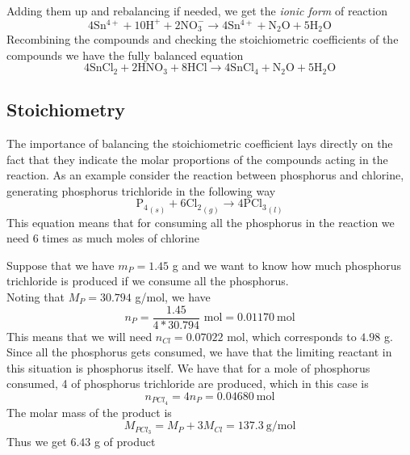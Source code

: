\documentclass[../qm.tex]{subfiles}
\begin{document}
\begin{mtd}
\begin{equation*}
\begin{aligned}
		\end{aligned}
	\end{equation*}
	Adding them up and rebalancing if needed, we get the \textit{ionic form} of reaction \label{eq:semiexp.chem}
	\begin{equation*}
		4\mathrm{Sn^{4+}}+10\mathrm{H^{+}}+2\mathrm{NO_3^-}\to4\mathrm{Sn^{4+}}+\mathrm{N_2O}+5\mathrm{H_2O}
	\end{equation*}
	Recombining the compounds and checking the stoichiometric coefficients of the compounds we have the fully balanced equation
	\begin{equation}
		4\mathrm{SnCl_2}+2\mathrm{HNO_3}+8\mathrm{HCl}\to4\mathrm{SnCl_4}+\mathrm{N_2O}+5\mathrm{H_2O}
	\end{equation}
\end{mtd}
\subsection{Stoichiometry}
The importance of balancing the stoichiometric coefficient lays directly on the fact that they indicate the molar proportions of the compounds acting in the reaction. As an example consider the reaction between phosphorus and chlorine, generating phosphorus trichloride in the following way
\begin{equation}
	\mathrm{P_4}_{(s)}+6\mathrm{Cl_2}_{(g)}\to4\mathrm{PCl_3}_{(l)}
	\label{eq:pcl3.chem}
\end{equation}
This equation means that for consuming all the phosphorus in the reaction we need 6 times as much moles of chlorine
\begin{eg}
	Suppose that we have $m_P=1.45$ g and we want to know how much phosphorus trichloride is produced if we consume all the phosphorus.\\
	Noting that $M_P=30.794$ g/mol, we have
	\begin{equation*}
		n_P=\frac{1.45}{4*30.794}\text{ mol}=0.01170\ \mathrm{mol}
	\end{equation*}
	This means that we will need $n_{Cl}=0.07022$ mol, which corresponds to $4.98$ g.\\
	Since all the phosphorus gets consumed, we have that the limiting reactant in this situation is phosphorus itself. We have that for a mole of phosphorus consumed, 4 of phosphorus trichloride are produced, which in this case is
	\begin{equation*}
		n_{PCl_4}=4n_{P}=0.04680\ \mathrm{mol}
	\end{equation*}
	The molar mass of the product is
	\begin{equation*}
		M_{PCl_3}=M_{P}+3M_{Cl}=137.3\ \mathrm{g/mol}
	\end{equation*}
	Thus we get $6.43$ g of product
\end{eg}
\end{document}
